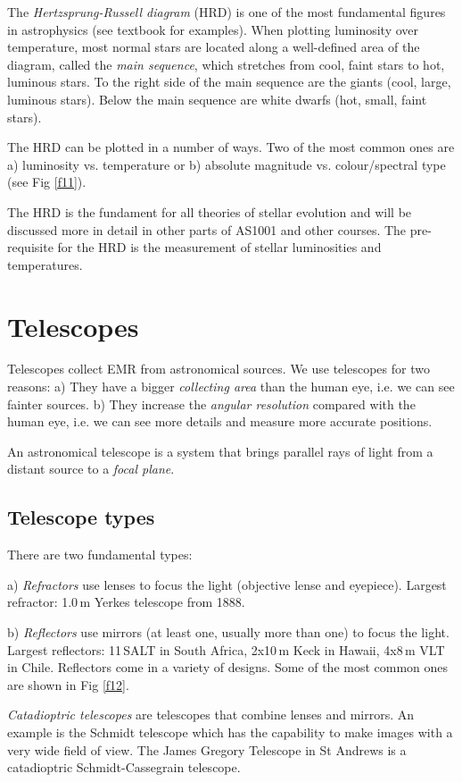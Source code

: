 The \textit{Hertzsprung-Russell diagram} (HRD) is one of the most fundamental figures in astrophysics (see textbook for examples). When plotting luminosity over temperature, most normal stars are located along a well-defined area of the diagram, called the \textit{main sequence}, which stretches from cool, faint stars to hot, luminous stars. To the right side of the main sequence are the giants (cool, large, luminous stars). Below the main sequence are white dwarfs (hot, small, faint stars).

The HRD can be plotted in a number of ways. Two of the most common ones are a) luminosity vs. temperature or b) absolute magnitude vs. colour/spectral type (see Fig \ref{f11}).

The HRD is the fundament for all theories of stellar evolution and will be discussed more in detail in other parts of AS1001 and other courses. The pre-requisite for the HRD is the measurement of stellar luminosities and temperatures. 

\section{Telescopes}

Telescopes collect EMR from astronomical sources. We use telescopes for two reasons: a) They have a bigger \textit{collecting area} than the human eye, i.e. we can see fainter sources. b) They increase the \textit{angular resolution} compared with the human eye, i.e. we can see more details and measure more accurate positions.

An astronomical telescope is a system that brings parallel rays of light from a distant source to a \textit{focal plane}.

\subsection{Telescope types}

There are two fundamental types:

a) \textit{Refractors} use lenses to focus the light (objective lense and eyepiece). Largest refractor: 1.0\,m Yerkes telescope from 1888. 

b) \textit{Reflectors} use mirrors (at least one, usually more than one) to focus the light. Largest reflectors: 
11\,SALT in South Africa, 2x10\,m Keck in Hawaii, 4x8\,m VLT in Chile. Reflectors come in a variety of designs. Some of the most common ones are shown in Fig \ref{f12}.

\textit{Catadioptric telescopes} are telescopes that combine lenses and mirrors. An example is the Schmidt telescope which has the capability to make images with a very wide field of view. The James Gregory Telescope in St Andrews is a catadioptric Schmidt-Cassegrain telescope.

